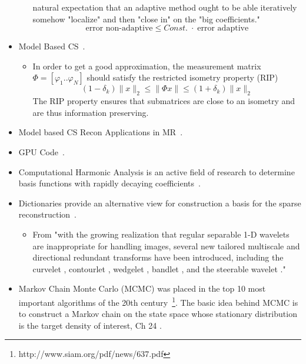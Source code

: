 \documentclass[10pt]{amsart}
\begin{document}
\begin{itemize}
\begin{itemize}
natural expectation that an adaptive method ought to be able
iteratively somehow "localize" and then "close in" on the "big
coefficients."
   \[
     \text{error non-adaptive} \leq Const. \; \cdot \; \text{error adaptive}
   \]
  \end{itemize}
    \item Model Based CS~\cite{Baraniuk2010}.
  \begin{itemize}
    \item In order to get a good approximation, the measurement matrix 
         $\Phi = \left[\varphi_1 .. \varphi_N \right]$ should satisfy the restricted
          isometry property (RIP)
          \begin{equation} \label{RIPMatrix}
           (1-\delta_k) \|x\|_2 \leq \|\Phi x\| \leq (1+\delta_k) \|x\|_2
          \end{equation}
          The RIP property ensures that submatrices are close to an isometry
          and are thus information preserving.
  \end{itemize}
    \item Model based CS Recon Applications in MR~\cite{Cao2014,Wright2014,Asslander2013}.
    \item GPU Code~\cite{Farber2011a,Munshi2011,Hansen2013}.
    \item Computational Harmonic Analysis is an active field of research to
determine basis functions with rapidly decaying
coefficients~\cite{feichtinger1989atomic,candes2004new}.
    \item Dictionaries provide an alternative view for construction a basis
          for the sparse reconstruction~\cite{Candes2011,Aharon2006,Elad2006}.
         \begin{itemize}
             \item From \cite{Elad2006} "with the growing realization that regular
separable 1-D wavelets are inappropriate for handling images, several new tailored multiscale and directional redundant
transforms have been introduced, including the curvelet \cite{candes2002recovering,candes2004new},
contourlet \cite{do2003contourlets,do2003framing}, wedgelet \cite{donoho1999wedgelets}, 
bandlet\cite{le2005sparse,le2005bandelet} , and the steerable wavelet \cite{freeman1991design,simoncelli1992shiftable}."
         \end{itemize}
    \item Markov Chain Monte Carlo (MCMC) was placed in the top 10 most important algorithms of the
	  20th century~\footnote{http://www.siam.org/pdf/news/637.pdf}.  The
          basic idea behind MCMC is to construct a Markov chain  on the state space
          whose stationary distribution is the target density of
          interest, Ch 24 \cite{Murphy2012a}.
  \end{itemize}
\end{document}
